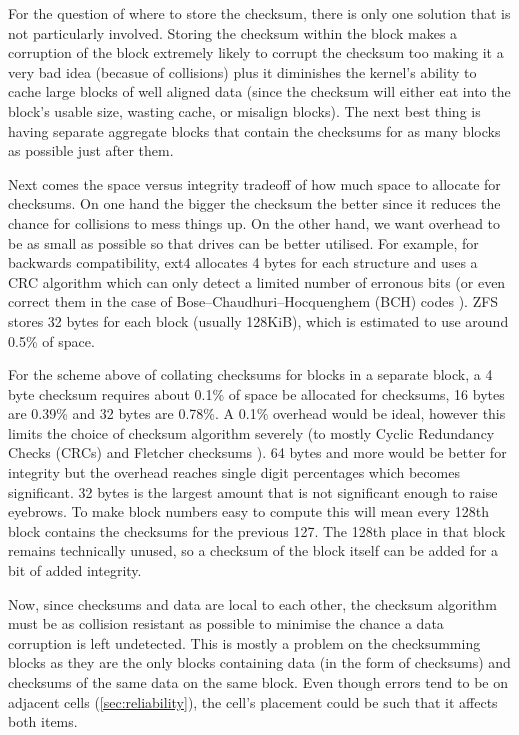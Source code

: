         For the question of where to store the checksum, there is only one
        solution that is not particularly involved. Storing the checksum within
        the block makes a corruption of the block extremely likely to corrupt
        the checksum too making it a very bad idea (becasue of collisions) plus
        it diminishes the kernel's ability to cache large blocks of well
        aligned data (since the checksum will either eat into the block's
        usable size, wasting cache, or misalign blocks). The next best thing is
        having separate aggregate blocks that contain the checksums for as many
        blocks as possible just after them.

        Next comes the space versus integrity tradeoff of how much space to
        allocate for checksums. On one hand the bigger the checksum the better
        since it reduces the chance for collisions to mess things up. On the
        other hand, we want overhead to be as small as possible so that drives
        can be better utilised. For example, for backwards compatibility, ext4
        allocates 4 bytes for each structure \cite{ext4_docs} and uses a CRC
        algorithm which can only detect a limited number of erronous bits (or
        even correct them in the case of Bose–Chaudhuri–Hocquenghem (BCH) codes
        \cite{flash_error_manual}). ZFS stores 32 bytes \cite{ZFS_docs} for
        each block (usually 128KiB), which is estimated to use around 0.5\%
        \cite{ZFS_overhead} of space.

        For the scheme above of collating checksums for blocks in a separate
        block, a 4 byte checksum requires about 0.1\% of space be allocated for
        checksums, 16 bytes are 0.39\% and 32 bytes are 0.78\%. A 0.1\%
        overhead would be ideal, however this limits the choice of checksum
        algorithm severely (to mostly Cyclic Redundancy Checks (CRCs) and
        Fletcher checksums \cite{embedded_checksums}). 64 bytes and more would
        be better for integrity but the overhead reaches single digit
        percentages which becomes significant. 32 bytes is the largest amount
        that is not significant enough to raise eyebrows. To make block numbers
        easy to compute this will mean every 128th block contains the checksums
        for the previous 127. The 128th place in that block remains technically
        unused, so a checksum of the block itself can be added for a bit of
        added integrity.

        Now, since checksums and data are local to each other, the checksum
        algorithm must be as collision resistant as possible to minimise the
        chance a data corruption is left undetected. This is mostly a problem
        on the checksumming blocks as they are the only blocks containing data
        (in the form of checksums) and checksums of the same data on the same
        block. Even though errors tend to be on adjacent cells
        (\autoref{sec:reliability}), the cell's placement could be such that it
        affects both items.

